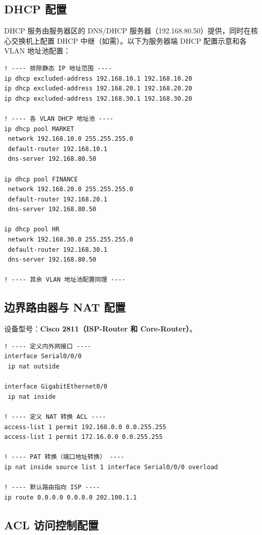 \documentclass[12pt,a4paper]{ctexart}
\begin{document}
\subsection{DHCP 配置}

DHCP 服务由服务器区的 DNS/DHCP 服务器（192.168.80.50）提供，同时在核心交换机上配置 DHCP 中继（如需）。以下为服务器端 DHCP 配置示意和各 VLAN 地址池配置：

\begin{lstlisting}[caption={核心交换机 DHCP 配置}, label={lst:dhcp}]
! ---- 排除静态 IP 地址范围 ----
ip dhcp excluded-address 192.168.10.1 192.168.10.20
ip dhcp excluded-address 192.168.20.1 192.168.20.20
ip dhcp excluded-address 192.168.30.1 192.168.30.20

! ---- 各 VLAN DHCP 地址池 ----
ip dhcp pool MARKET
 network 192.168.10.0 255.255.255.0
 default-router 192.168.10.1
 dns-server 192.168.80.50

ip dhcp pool FINANCE
 network 192.168.20.0 255.255.255.0
 default-router 192.168.20.1
 dns-server 192.168.80.50

ip dhcp pool HR
 network 192.168.30.0 255.255.255.0
 default-router 192.168.30.1
 dns-server 192.168.80.50

! ---- 其余 VLAN 地址池配置同理 ----
\end{lstlisting}

\subsection{边界路由器与 NAT 配置}

设备型号：\textbf{Cisco 2811（ISP-Router 和 Core-Router）}。

\begin{lstlisting}[caption={NAT 配置（Core-Router）}, label={lst:nat}]
! ---- 定义内外网接口 ----
interface Serial0/0/0
 ip nat outside

interface GigabitEthernet0/0
 ip nat inside

! ---- 定义 NAT 转换 ACL ----
access-list 1 permit 192.168.0.0 0.0.255.255
access-list 1 permit 172.16.0.0 0.0.255.255

! ---- PAT 转换（端口地址转换） ----
ip nat inside source list 1 interface Serial0/0/0 overload

! ---- 默认路由指向 ISP ----
ip route 0.0.0.0 0.0.0.0 202.100.1.1
\end{lstlisting}

\subsection{ACL 访问控制配置}
\end{document}
